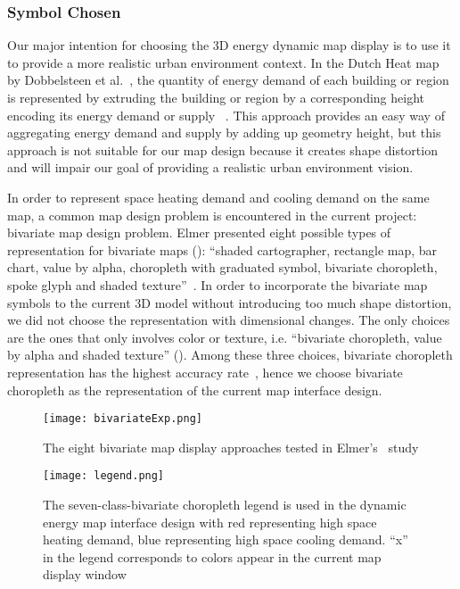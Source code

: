 \subsubsection{Symbol Chosen}
Our major intention for choosing the 3D energy dynamic map display is
to use it to provide a more realistic urban environment context.  In
the Dutch Heat map by Dobbelsteen et al.\ , the quantity of energy
demand of each building or region is represented by extruding the
building or region by a corresponding height encoding its energy
demand or supply ~\cite{Dobbelsteen2013}. This approach provides an
easy way of aggregating energy demand and supply by adding up geometry
height, but this approach is not suitable for our map design because
it creates shape distortion and will impair our goal of providing a
realistic urban environment vision.

In order to represent space heating demand and cooling demand on the
same map, a common map design problem is encountered in the current
project: bivariate map design problem. Elmer presented eight possible
types of representation for bivariate maps ():
``shaded cartographer, rectangle map, bar chart, value by alpha,
choropleth with graduated symbol, bivariate choropleth, spoke glyph
and shaded texture''~\cite{Elmer2012}. In order to incorporate the
bivariate map symbols to the current 3D model without introducing too
much shape distortion, we did not choose the representation with
dimensional changes. The only choices are the ones that only involves
color or texture, i.e. ``bivariate choropleth, value by alpha and
shaded texture'' (). Among these three choices,
bivariate choropleth representation has the highest accuracy
rate~\cite{Elmer2012}, hence we choose bivariate choropleth as the
representation of the current map interface design.

\begin{figure}[h!]
  \centering
  \texttt{[image: bivariateExp.png]}
  \caption[Bivariate Map Symbol Tested]{The eight bivariate map
    display approaches tested in Elmer's~\cite{Elmer2012} study}
  \label{fig:bivariateExp}
\end{figure}

\begin{figure}[h!]
  \centering
  \texttt{[image: legend.png]}
  \caption[Bivariate Map Legend]{The seven-class-bivariate choropleth
    legend is used in the dynamic energy map interface design with red
    representing high space heating demand, blue representing high
    space cooling demand. ``x'' in the legend corresponds to colors
    appear in the current map display window}
  \label{fig:legend}
\end{figure}

